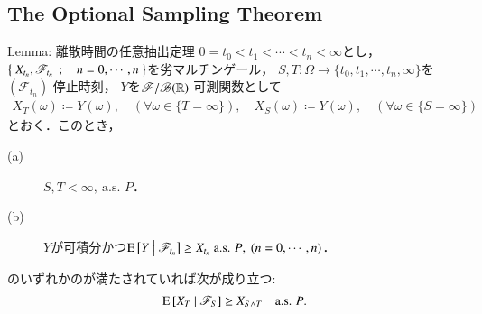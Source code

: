 \subsection{The Optional Sampling Theorem}
	\begin{itembox}[l]{Lemma: 離散時間の任意抽出定理}\label{lem:optional_sampling_theorem}
		$0 = t_0 < t_1 < \cdots < t_n < \infty$とし，
		$\left\{\ X_{t_n},\mathscr{F}_{t_n}\ \, ; \quad n=0,\cdots,n\ \right\}$を劣マルチンゲール，
		$S,T:\Omega \longrightarrow \{t_0,t_1,\cdots,t_n,\infty\}$を$(\mathscr{F}_{t_n})$-停止時刻，
		$Y$を$\mathscr{F}/\mathscr{B}(\mathbb{R})$-可測関数として
		\begin{align}
			X_T(\omega) \coloneqq Y(\omega), \quad (\forall \omega \in \{T=\infty\}), \quad
			X_S(\omega) \coloneqq Y(\omega), \quad (\forall \omega \in \{S=\infty\})
		\end{align}
		とおく．このとき，
		\begin{description}
			\item[(a)] $S,T < \infty,\ \mbox{a.s. $P$}$．
			\item[(b)] $Y$が可積分かつ$\cexp{Y}{\mathscr{F}_{t_n}} \geq X_{t_n}\ \mbox{a.s. $P$},\ (n=0,\cdots,n)$．
		\end{description}
		のいずれかのが満たされていれば次が成り立つ:
		\begin{align}
			\operatorname{E} \left[ X_T \ \middle|\ \mathscr{F}_S \right] \geq X_{S \wedge T}
			\quad \mbox{a.s. $P$}.
			\label{eq:lem_optional_sampling_theorem_1}
		\end{align}
	\end{itembox}
	
